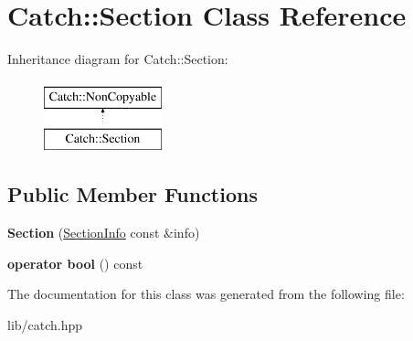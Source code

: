 \hypertarget{class_catch_1_1_section}{}\section{Catch\+:\+:Section Class Reference}
\label{class_catch_1_1_section}
Inheritance diagram for Catch\+:\+:Section\+:\begin{figure}[H]
\begin{center}
\leavevmode
\includegraphics[height=2.000000cm]{class_catch_1_1_section}
\end{center}
\end{figure}
\subsection*{Public Member Functions}
\begin{DoxyCompactItemize}
\item 
\mbox{\label{class_catch_1_1_section_a68fd4e51e8981aaa7ddb00d8a6abd099}} 
{\bfseries Section} (\mbox{\hyperlink{struct_catch_1_1_section_info}{Section\+Info}} const \&info)
\item 
\mbox{\label{class_catch_1_1_section_a0632b804dcea1417a2970620a9742eb3}} 
{\bfseries operator bool} () const
\end{DoxyCompactItemize}


The documentation for this class was generated from the following file\+:\begin{DoxyCompactItemize}
\item 
lib/catch.\+hpp\end{DoxyCompactItemize}
